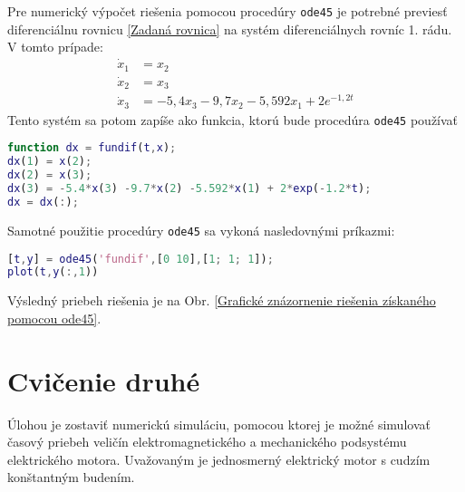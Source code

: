 \documentclass[a4paper, 10pt, ]{article}
\begin{document}
Pre numerický výpočet riešenia pomocou procedúry \verb|ode45| je potrebné previesť diferenciálnu rovnicu \eqref{Zadaná rovnica} na systém diferenciálnych rovníc 1. rádu. V tomto prípade:
\begin{subequations}
	\begin{align}
		\dot x_1 &= x_2 \\
		\dot x_2 &= x_3 \\
		\dot x_3 &= -5,4 x_3 -9,7 x_2 -5,592 x_1 + 2 e^{-1,2 t}
	\end{align}
\end{subequations}
Tento systém sa potom zapíše ako funkcia, ktorú bude procedúra \verb|ode45| používať
\begin{lstlisting}[language=Matlab,]
function dx = fundif(t,x);
dx(1) = x(2);
dx(2) = x(3);
dx(3) = -5.4*x(3) -9.7*x(2) -5.592*x(1) + 2*exp(-1.2*t);
dx = dx(:);
\end{lstlisting}
Samotné použitie procedúry \verb|ode45| sa vykoná nasledovnými príkazmi:
\begin{lstlisting}[language=Matlab,]
[t,y] = ode45('fundif',[0 10],[1; 1; 1]);
plot(t,y(:,1))
\end{lstlisting}
Výsledný priebeh riešenia je na Obr. \ref{Grafické znázornenie riešenia získaného pomocou ode45}.

\begin{center}


	\label{Grafické znázornenie riešenia získaného pomocou ode45}

\end{center}






















\section{Cvičenie druhé}

Úlohou je zostaviť numerickú simuláciu, pomocou ktorej je možné simulovať časový priebeh veličín elektromagnetického a mechanického podsystému elektrického motora. Uvažovaným je jednosmerný elektrický motor s cudzím konštantným budením.
\end{document}
